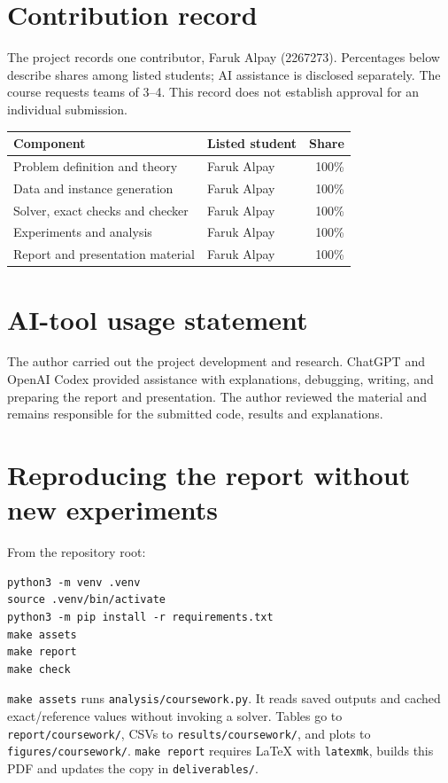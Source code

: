 \section{Contribution record}
The project records one contributor, Faruk Alpay (2267273). Percentages below describe shares
among listed students; AI assistance is disclosed separately. The course requests teams of 3--4.
This record does not establish approval for an individual submission.

\begin{center}\small
\begin{tabularx}{\linewidth}{@{}Xlr@{}}\toprule
Component & Listed student & Share \\\midrule
Problem definition and theory & Faruk Alpay & 100\% \\
Data and instance generation & Faruk Alpay & 100\% \\
Solver, exact checks and checker & Faruk Alpay & 100\% \\
Experiments and analysis & Faruk Alpay & 100\% \\
Report and presentation material & Faruk Alpay & 100\% \\\bottomrule
\end{tabularx}\end{center}

\section{AI-tool usage statement}
The author carried out the project development and research. ChatGPT and OpenAI Codex
provided assistance with explanations, debugging, writing, and preparing the report and
presentation. The author reviewed the material and remains responsible for the submitted
code, results and explanations.

\clearpage\section{Reproducing the report without new experiments}
From the repository root:
\begin{verbatim}
python3 -m venv .venv
source .venv/bin/activate
python3 -m pip install -r requirements.txt
make assets
make report
make check
\end{verbatim}
\texttt{make assets} runs \texttt{analysis/coursework.py}. It reads saved outputs and cached
exact/reference values without invoking a solver. Tables go to \texttt{report/coursework/},
CSVs to \texttt{results/coursework/}, and plots to \texttt{figures/coursework/}.
\texttt{make report} requires LaTeX with \texttt{latexmk}, builds this PDF and updates the copy
in \texttt{deliverables/}.

